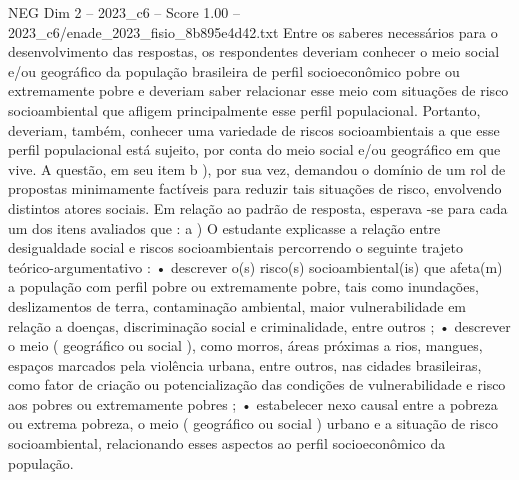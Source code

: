\begin{textsample}{NEG Dim 2 – 2023\_c6 – Score 1.00 – 2023\_c6/enade\_2023\_fisio\_8b895e4d42.txt}
Entre os saberes necessários para o desenvolvimento das respostas, os respondentes deveriam conhecer o meio social e/ou geográfico da população brasileira de perfil socioeconômico pobre ou extremamente pobre e deveriam saber relacionar esse meio com situações de risco socioambiental que afligem principalmente esse perfil populacional.
Portanto, deveriam, também, conhecer uma variedade de riscos socioambientais a que esse perfil populacional está sujeito, por conta do meio social e/ou geográfico em que vive.
A questão, em seu item b ), por sua vez, demandou o domínio de um rol de propostas minimamente factíveis para reduzir tais situações de risco, envolvendo distintos atores sociais.
Em relação ao padrão de resposta, esperava -se para cada um dos itens avaliados que : a ) O estudante explicasse a relação entre desigualdade social e riscos socioambientais percorrendo o seguinte trajeto teórico-argumentativo : • descrever o(s) risco(s) socioambiental(is) que afeta(m) a população com perfil pobre ou extremamente pobre, tais como inundações, deslizamentos de terra, contaminação ambiental, maior vulnerabilidade em relação a doenças, discriminação social e criminalidade, entre outros ; • descrever o meio ( geográfico ou social ), como morros, áreas próximas a rios, mangues, espaços marcados pela violência urbana, entre outros, nas cidades brasileiras, como fator de criação ou potencialização das condições de vulnerabilidade e risco aos pobres ou extremamente pobres ; • estabelecer nexo causal entre a pobreza ou extrema pobreza, o meio ( geográfico ou social ) urbano e a situação de risco socioambiental, relacionando esses aspectos ao perfil socioeconômico da população.

\end{textsample}
